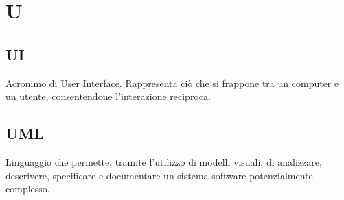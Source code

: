 \section*{U}
\markright{}

\subsection*{UI}
Acronimo di User Interface. Rappresenta ciò che si frappone tra un computer e un utente, consentendone l'interazione reciproca.

\subsection*{UML}
Linguaggio che permette, tramite l'utilizzo di modelli visuali, di analizzare, descrivere, specificare e documentare un sistema software potenzialmente complesso.
